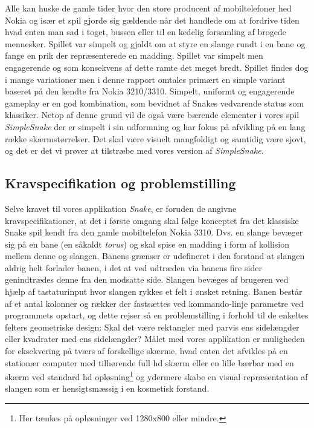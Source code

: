 \documentclass[]{article}
\begin{document}
	Alle kan huske de gamle tider hvor den store producent af mobiltelefoner hed Nokia og især et spil gjorde sig gældende når det handlede om at fordrive tiden hvad enten man sad i toget, bussen eller til en kedelig forsamling af brogede mennesker. Spillet var simpelt og gjaldt om at styre en slange rundt i en bane og fange en prik der repræsenterede en madding. Spillet var simpelt men engagerende og som konsekvens af dette ramte det meget bredt. Spillet findes dog i mange variationer men i denne rapport omtales primært en simple variant baseret på den kendte fra Nokia 3210/3310. Simpelt, uniformt og engagerende gameplay er en god kombination, som bevidnet af Snakes vedvarende status som klassiker. Netop af denne grund vil de også være bærende elementer i vores spil \textit{SimpleSnake} der er simpelt i sin udformning og har fokus på afvikling på en lang række skærmstørrelser. Det skal være visuelt mangfoldigt og samtidig være sjovt, og det er det vi prøver at tilstræbe med vores version af \textit{SimpleSnake}. 
	
	\subsection{Kravspecifikation og problemstilling}
	
	Selve kravet til  vores applikation \textit{Snake}, er foruden de angivne kravspecifikationer, at det i første omgang skal følge konceptet fra det klassiske Snake spil kendt fra den gamle mobiltelefon Nokia 3310. Dvs. en slange bevæger sig på en bane (en såkaldt \textit{torus}) og skal spise en madding i form af kollision mellem denne og slangen. Banens grænser er udefineret i den forstand at slangen aldrig helt forlader banen, i det at ved udtræden via banens fire sider genindtrædes denne fra den modsatte side. Slangen bevæges af brugeren ved hjælp af tastaturinput hvor slangen rykkes et felt i ønsket retning. Banen består af et antal kolonner og rækker der fastsættes ved kommando-linje parametre ved programmets opstart, og dette rejser så en problemstilling i forhold til de enkeltes felters geometriske design: Skal det være rektangler med parvis ens sidelængder eller kvadrater med ens sidelængder? Målet med vores applikation er muligheden for eksekvering på tværs af forskellige skærme, hvad enten det afvikles på en stationær computer med tilhørende full hd skærm eller en lille bærbar med en skærm ved standard hd opløsning\footnote{Her tænkes på opløsninger ved 1280x800 eller mindre.} og ydermere skabe en visual repræsentation af slangen som er hensigtsmæssig i en kosmetisk forstand. 
	
\end{document}
